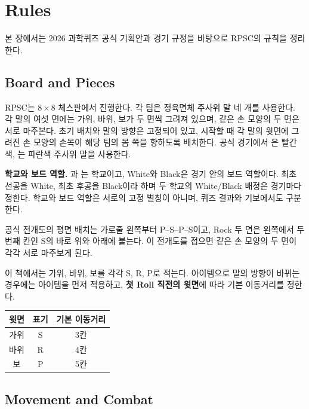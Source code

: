 \chapter{Rules}

본 장에서는 2026 과학퀴즈 공식 기획안과 경기 규정을 바탕으로 RPSC의 규칙을 정리한다.

\section{Board and Pieces}

RPSC는 $8\times8$ 체스판에서 진행한다. 각 팀은 정육면체 주사위 말 네 개를 사용한다. 각 말의 여섯 면에는 가위, 바위, 보가 두 면씩 그려져 있으며, 같은 손 모양의 두 면은 서로 마주본다. 초기 배치와 말의 방향은 고정되어 있고, 시작할 때 각 말의 윗면에 그려진 손 모양의 손목이 해당 팀의 몸 쪽을 향하도록 배치한다. 공식 경기에서 \POSTECH{}은 빨간색, \KAIST{}는 파란색 주사위 말을 사용한다.

\medskip
\noindent\textbf{학교와 보드 역할.}
\POSTECH{}과 \KAIST{}는 학교이고, White와 Black은 경기 안의 보드 역할이다. 최초 선공을 White, 최초 후공을 Black이라 하며 두 학교의 White/Black 배정은 경기마다 정한다. 학교와 보드 역할은 서로의 고정 별칭이 아니며, 퀴즈 결과와 기보에서도 구분한다.



공식 전개도의 평면 배치는 가로줄 왼쪽부터 P--S--P--S이고, Rock 두 면은 왼쪽에서 두 번째 칸인 S의 바로 위와 아래에 붙는다. 이 전개도를 접으면 같은 손 모양의 두 면이 각각 서로 마주보게 된다.

이 책에서는 가위, 바위, 보를 각각 S, R, P로 적는다. 아이템으로 말의 방향이 바뀌는 경우에는 아이템을 먼저 적용하고, \textbf{첫 Roll 직전의 윗면}에 따라 기본 이동거리를 정한다.

\begin{center}\renewcommand{\arraystretch}{1.15}\begin{tabular}{@{}ccc@{}}\toprule
윗면 & 표기 & 기본 이동거리 \\\midrule
가위 & S & 3칸 \\
바위 & R & 4칸 \\
보 & P & 5칸 \\\bottomrule
\end{tabular}\end{center}

\section{Movement and Combat}

